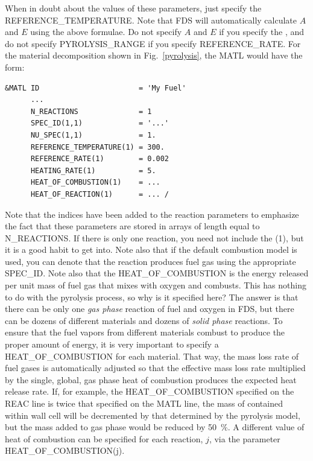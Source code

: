 \documentclass[11pt]{book}
\begin{document}
When in doubt about the values of these parameters, just specify the {\ct REFERENCE\_TEMPERATURE}. Note that FDS will automatically calculate $A$ and $E$ using the above formulae. Do not specify $A$ and $E$ if you specify the , and do not specify {\ct PYROLYSIS\_RANGE} if you specify {\ct REFERENCE\_RATE}. For the material decomposition shown in Fig.~\ref{pyrolysis}, the {\ct MATL} would have the form:
\begin{lstlisting}
&MATL ID                       = 'My Fuel'
      ...
      N_REACTIONS              = 1
      SPEC_ID(1,1)             = '...'
      NU_SPEC(1,1)             = 1.
      REFERENCE_TEMPERATURE(1) = 300.
      REFERENCE_RATE(1)        = 0.002
      HEATING_RATE(1)          = 5.
      HEAT_OF_COMBUSTION(1)    = ...
      HEAT_OF_REACTION(1)      = ... /
\end{lstlisting}
Note that the indices have been added to the reaction parameters to
emphasize the fact that these parameters are stored in arrays of
length equal to {\ct N\_REACTIONS}. If there is only one reaction, you
need not include the {\ct (1)}, but it is a good habit to get into.
Note also that if the default combustion model is used, you can denote that the reaction
produces fuel gas using the appropriate {\ct SPEC\_ID}.
Note also that the {\ct HEAT\_OF\_COMBUSTION} is the energy released
per unit mass of fuel gas that mixes with oxygen and combusts.  This
has nothing to do with the pyrolysis process, so why is it specified
here? The answer is that there can be only one {\em gas phase}
reaction of fuel and oxygen in FDS, but there can be dozens of
different materials and dozens of {\em solid phase} reactions. To
ensure that the fuel vapors from different materials combust to
produce the proper amount of energy, it is very important to specify a
{\ct HEAT\_OF\_COMBUSTION} for each material. That way, the mass loss
rate of fuel gases is automatically adjusted so that the effective
mass loss rate multiplied by the single, global, gas phase heat of
combustion produces the expected heat release rate.
If, for example, the {\ct HEAT\_OF\_COMBUSTION} specified on the {\ct REAC} line is twice that
specified on the {\ct MATL} line, the mass of contained within wall
cell will be decremented by that determined by the pyrolysis model,
but the mass added to gas phase would be reduced by 50~\%. A different
value of heat of combustion can be specified for each reaction, $j$, via the parameter {\ct HEAT\_OF\_COMBUSTION(j)}.
\end{document}
